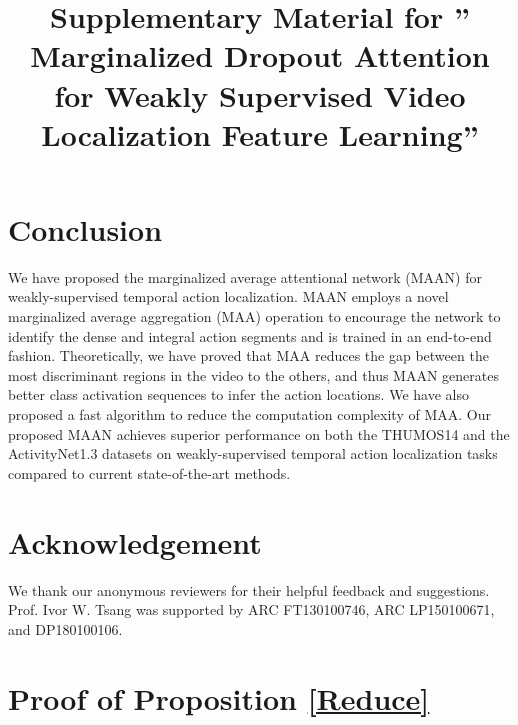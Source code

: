 \documentclass{article} \usepackage{iclr2019_conference,times}
\begin{document}
\section{Conclusion}





We have proposed the marginalized average attentional network (MAAN) for weakly-supervised temporal action localization. MAAN employs a novel marginalized average aggregation (MAA) operation to encourage the network to identify the dense and integral action segments and is trained in an end-to-end fashion. Theoretically, we have proved that MAA reduces the gap between the most discriminant regions in the video to the others, and thus MAAN generates better class activation sequences to infer the action locations. We have also proposed a fast algorithm to reduce the computation complexity of MAA. 
Our proposed MAAN achieves superior performance on both the THUMOS14 and the ActivityNet1.3 datasets on weakly-supervised temporal action localization tasks compared to current state-of-the-art methods.





\section{Acknowledgement}
We thank our anonymous reviewers for their helpful feedback and suggestions. Prof. Ivor W. Tsang was supported by ARC FT130100746, ARC LP150100671, and DP180100106. 






\newpage

\newpage
\onecolumn


\title{Supplementary Material for  '' Marginalized Dropout Attention for Weakly Supervised Video Localization Feature Learning''}

\appendix


\section{Proof of Proposition \ref{Reduce}}\label{proof_reduce}
\end{document}
